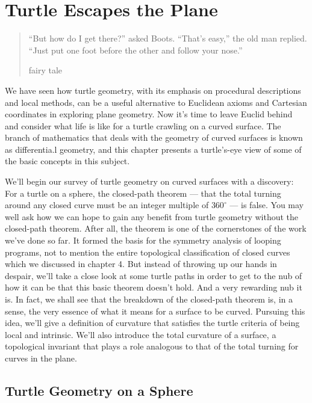 \documentclass{book}
\begin{document}
\chapter{Turtle Escapes the Plane}
\begin{quote}``But how do I get there?'' asked Boots. ``That's
easy,'' the old man replied. ``Just put one foot
before the other and follow your nose.''

fairy tale
\end{quote}

We have seen how turtle geometry, with its emphasis on procedural
descriptions and local methods, can be a useful alternative to Euclidean
axioms and Cartesian coordinates in exploring plane geometry. Now
it's time to leave Euclid behind and consider what life is like for a turtle
crawling on a curved surface. The branch of mathematics that deals with
the geometry of curved surfaces is known as differentia.l geometry, and
this chapter presents a turtle's-eye view of some of the basic concepts in
this subject.

We'll begin our survey of turtle geometry on curved surfaces with a
discovery: For a turtle on a sphere, the closed-path theorem --- that the
total turning around any closed curve must be an integer multiple of
$360^{\circ}$ --- is false. You may well ask how we can hope to gain any benefit
from turtle geometry without the closed-path theorem. After all, the
theorem is one of the cornerstones of the work we've done so far. It
formed the basis for the symmetry analysis of looping programs, not to
mention the entire topological classification of closed curves which we
discussed in chapter 4. But instead of throwing up our hands in despair,
we'll take a close look at some turtle paths in order to get to the nub of
how it can be that this basic theorem doesn't hold. And a very rewarding
nub it is. In fact, we shall see that the breakdown of the closed-path
theorem is, in a sense, the very essence of what it means for a surface
to be curved. Pursuing this idea, we'll give a definition of curvature
that satisfies the turtle criteria of being local and intrinsic. We'll also
introduce the total curvature of a surface, a topological invariant that
plays a role analogous to that of the total turning for curves in the plane.

\section{Turtle Geometry on a Sphere}
\end{document}
